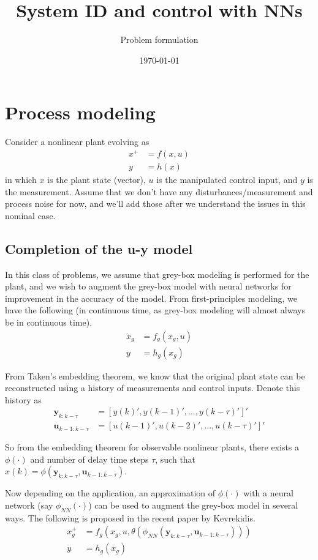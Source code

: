 \documentclass{article}
\title{System ID and control with NNs}
\author{Problem formulation}
\date{\today}
\begin{document}
\maketitle

\section{Process modeling}
Consider a nonlinear plant evolving as
\begin{align*}
  x^+ &= f(x, u) \\
  y &= h(x)
\end{align*}
in which $x$ is the plant state (vector), $u$ is the manipulated control input,
and $y$ is the measurement. Assume that we don't have any 
disturbances/measurement and process noise 
for now, and we'll add those after we 
understand the issues in this nominal case.

\subsection{Completion of the u-y model}
In this class of problems, we assume that grey-box modeling is performed 
for the plant, and we wish to augment the grey-box model with neural networks
for improvement in the accuracy of the model. From first-principles modeling, 
we have the following (in continuous time, as grey-box modeling will 
almost always be in continuous time).
\begin{align*}
  \dot{x}_g &= f_g(x_g, u) \\
  y &= h_g(x_g)
\end{align*}

From Taken's embedding theorem, we know that the original plant state
can be reconstructed using a history of measurements and control inputs.
Denote this history as 
\begin{align*}
  \mathbf{y}_{k:k-\tau} &= [y(k)', y(k-1)', ..., y(k-\tau)']' \\
  \mathbf{u}_{k-1:k-\tau} &= [u(k-1)', u(k-2)', ..., u(k-\tau)']'
\end{align*}

So from the embedding theorem for observable nonlinear plants, 
there exists a $\phi(\cdot)$ and number of delay 
time steps $\tau$, such that 
$x(k) = \phi(\mathbf{y}_{k:k-\tau}, \mathbf{u}_{k-1:k-\tau})$.

Now depending on the application, an approximation of $\phi(\cdot)$
with a neural network (say $\phi_{NN}(\cdot)$) 
can be used to augment the grey-box model 
in several ways. The following is proposed in the recent 
paper by Kevrekidis.
\begin{align*}
  x_g^+ &= f_g(x_g, u, 
  \theta(\phi_{NN}(\mathbf{y}_{k:k-\tau}, \mathbf{u}_{k-1:k-\tau})))\\
  y &= h_g(x_g)
\end{align*}
\end{document}
